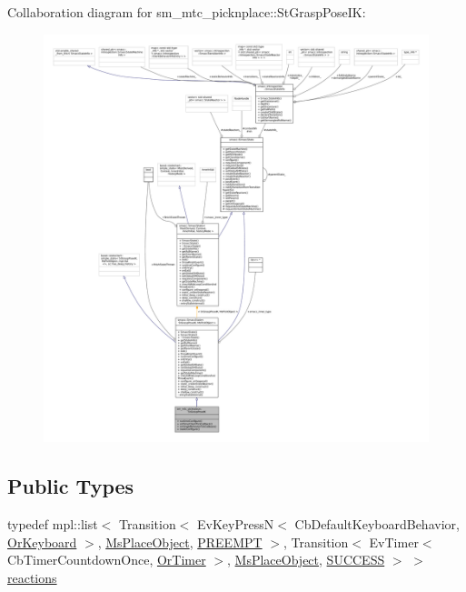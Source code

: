 Collaboration diagram for sm\+\_\+mtc\+\_\+picknplace\+:\+:St\+Grasp\+Pose\+IK\+:
\nopagebreak
\begin{figure}[H]
\begin{center}
\leavevmode
\includegraphics[width=350pt]{structsm__mtc__picknplace_1_1StGraspPoseIK__coll__graph}
\end{center}
\end{figure}
\subsection*{Public Types}
\begin{DoxyCompactItemize}
\item 
typedef mpl\+::list$<$ Transition$<$ Ev\+Key\+PressN$<$ Cb\+Default\+Keyboard\+Behavior, \hyperlink{classsm__mtc__picknplace_1_1OrKeyboard}{Or\+Keyboard} $>$, \hyperlink{classsm__mtc__picknplace_1_1MsPlaceObject}{Ms\+Place\+Object}, \hyperlink{classPREEMPT}{P\+R\+E\+E\+M\+PT} $>$, Transition$<$ Ev\+Timer$<$ Cb\+Timer\+Countdown\+Once, \hyperlink{classsm__mtc__picknplace_1_1OrTimer}{Or\+Timer} $>$, \hyperlink{classsm__mtc__picknplace_1_1MsPlaceObject}{Ms\+Place\+Object}, \hyperlink{classSUCCESS}{S\+U\+C\+C\+E\+SS} $>$ $>$ \hyperlink{structsm__mtc__picknplace_1_1StGraspPoseIK_a74d9652fe8af4631334c81dd4ca54ce7}{reactions}
\end{DoxyCompactItemize}
